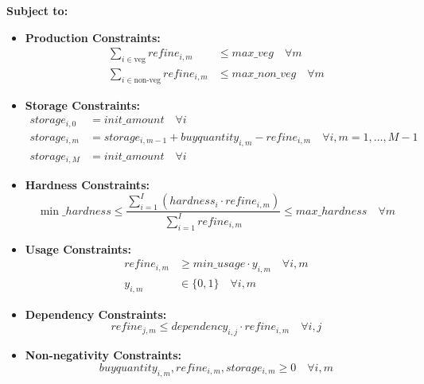 \documentclass{article}
\begin{document}
\textbf{Subject to:}

\begin{itemize}
    \item \textbf{Production Constraints:}
    \begin{align*}
        \sum_{i \in \text{veg}} refine_{i,m} & \leq max\_veg \quad \forall m \\
        \sum_{i \in \text{non-veg}} refine_{i,m} & \leq max\_non\_veg \quad \forall m
    \end{align*}

    \item \textbf{Storage Constraints:}
    \begin{align*}
        storage_{i,0} & = init\_amount \quad \forall i \\
        storage_{i,m} & = storage_{i,m-1} + buyquantity_{i,m} - refine_{i,m} \quad \forall i, m=1,\ldots,M-1 \\
        storage_{i,M} & = init\_amount \quad \forall i
    \end{align*}

    \item \textbf{Hardness Constraints:}
    \[
    \min\_hardness \leq \frac{\sum_{i=1}^{I} (hardness_{i} \cdot refine_{i,m})}{\sum_{i=1}^{I} refine_{i,m}} \leq max\_hardness \quad \forall m
    \]

    \item \textbf{Usage Constraints:}
    \begin{align*}
        refine_{i,m} & \geq min\_usage \cdot y_{i,m} \quad \forall i, m \\
        y_{i,m} & \in \{0,1\} \quad \forall i, m
    \end{align*}

    \item \textbf{Dependency Constraints:}
    \[
    refine_{j,m} \leq dependency_{i,j} \cdot refine_{i,m} \quad \forall i,j
    \]

    \item \textbf{Non-negativity Constraints:}
    \[
    buyquantity_{i,m}, refine_{i,m}, storage_{i,m} \geq 0 \quad \forall i,m
    \]
\end{itemize}
\end{document}
